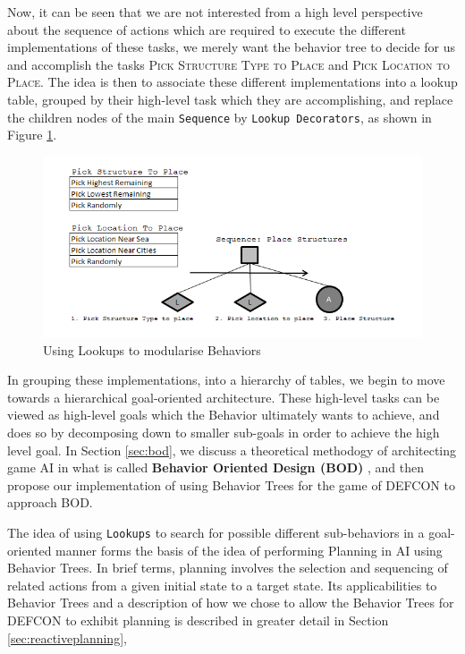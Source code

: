             Now, it can be seen that we are not interested from a high level perspective about the sequence of actions which are required to execute the different implementations of these tasks, we merely want the behavior tree to decide for us and accomplish the tasks \textsc{Pick Structure Type to Place} and \textsc{Pick Location to Place}. The idea is then to associate these different implementations into a lookup table, grouped by their high-level task which they are accomplishing, and replace the children nodes of the main \texttt{Sequence} by \texttt{Lookup Decorators}, as shown in Figure \ref{img:lookup2}.
                                   
            \begin{figure}[h]
                
                \begin{center}
                \includegraphics[scale=0.6]{images/lookup2.png}
                \caption{Using Lookups to modularise Behaviors}
                \label{img:lookup2}
                \end{center}            
            \end{figure}
            
            In grouping these implementations, into a hierarchy of tables, we begin to move towards a hierarchical goal-oriented architecture. These high-level tasks can be viewed as high-level goals which the Behavior ultimately wants to achieve, and does so by decomposing down to smaller sub-goals in order to achieve the high level goal. In Section \ref{sec:bod}, we discuss a theoretical methodogy of architecting game AI in what is called \textbf{Behavior Oriented Design (BOD)} \cite{bod}, and then propose our implementation of using Behavior Trees for the game of DEFCON to approach BOD.
            
            The idea of using \texttt{Lookups} to search for possible different sub-behaviors in a goal-oriented manner forms the basis of the idea of performing Planning in AI using Behavior Trees. In brief terms, planning involves the selection and sequencing of related actions from a given initial state to a target state. Its applicabilities to Behavior Trees and a description of how we chose to allow the Behavior Trees for DEFCON to exhibit planning is described in greater detail in Section \ref{sec:reactiveplanning}, 
            
